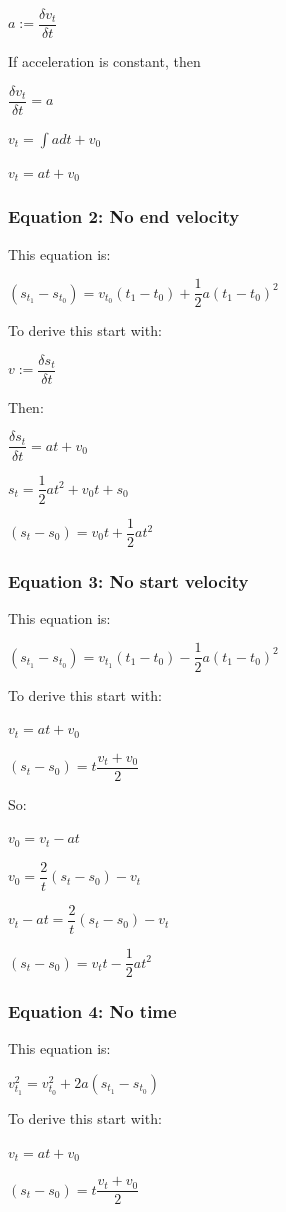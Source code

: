 \(a:=\dfrac{\delta v_t}{\delta t}\)

If acceleration is constant, then 

\(\dfrac{\delta v_t}{\delta t}=a\)

\(v_t=\int a dt +v_0\)

\(v_t=at+v_0\)
\subsubsection{Equation 2: No end velocity}

This equation is:

\((s_{t_1}-s_{t_0})=v_{t_0}(t_1-t_0)+\dfrac{1}{2}a(t_1-t_0)^2\)

To derive this start with:

\(v:=\dfrac{\delta s_t}{\delta t}\)

Then:

\(\dfrac{\delta s_t}{\delta t}=at+v_0\)

\(s_t=\dfrac{1}{2}at^2+v_0t+s_0\)

\((s_t-s_0)=v_0t+\dfrac{1}{2}at^2 \)

\subsubsection{Equation 3: No start velocity}

This equation is:

\((s_{t_1}-s_{t_0})=v_{t_1}(t_1-t_0)-\dfrac{1}{2}a(t_1-t_0)^2\)

To derive this start with:

\(v_t=at+v_0\)

\((s_t-s_0)=t\dfrac{v_t+v_0}{2}\)

So:

\(v_0=v_t-at\)

\(v_0=\dfrac{2}{t}(s_t-s_0)- v_t\)

\(v_t-at=\dfrac{2}{t}(s_t-s_0)- v_t\)

\((s_t-s_0)=v_tt-\dfrac{1}{2}at^2\)

\subsubsection{Equation 4: No time}

This equation is:

\(v_{t_1}^2= v_{t_0}^2+2a(s_{t_1}-s_{t_0})\)

To derive this start with:

\(v_t=at+v_0\)

\((s_t-s_0)=t\dfrac{v_t+v_0}{2}\)

